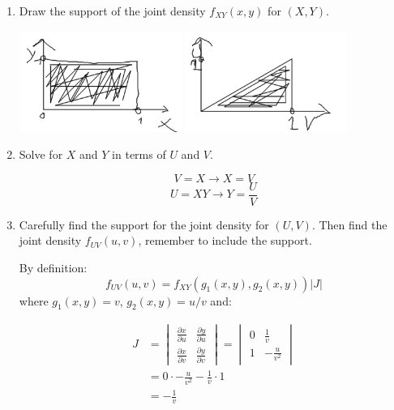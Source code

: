 \documentclass{article}
\newcommand{\1}{\mathbf{1}}
\begin{document}
\begin{enumerate}
    \item Draw the support of the joint density $f_{XY}(x,y)$ for $(X,Y)$.
    
    \begin{center}
    \includegraphics[width=200px]{STATS509/HW4/HW4Figures/picasso4a.png}
     \includegraphics[width=200px]{STATS509/HW4/HW4Figures/picasso4b.png}
    \end{center}

    \item Solve for $X$ and $Y$ in terms of $U$ and $V$.

    $$V=X \rightarrow X=V$$
    $$U=XY \rightarrow Y=\frac{U}{V}$$    
    
    \item Carefully find the support for the joint density for $(U,V)$. Then find the joint density $f_{UV}(u,v)$, remember to include the support.
    
    By definition:
    $$f_{UV}(u,v) = f_{XY}(g_1(x,y), g_2(x,y)) |J|$$
    where $g_1(x,y)=v$, $g_2(x,y)=u/v$ and:
    
    \begin{align*}
    J &= \begin{vmatrix}
        \frac{\partial x}{\partial u} & \frac{\partial y}{\partial u} \\ 
        \frac{\partial x}{\partial v} & \frac{\partial y}{\partial v}
        \end{vmatrix} 
     = \begin{vmatrix}
        0 & \frac{1}{v} \\ 
        1 & -\frac{u}{v^2}
        \end{vmatrix} \\
    &= 0\cdot -\frac{u}{v^2} - \frac{1}{v}\cdot 1 \\
    &= - \frac{1}{v}
    \end{align*}
    

\end{enumerate}
\end{document}
